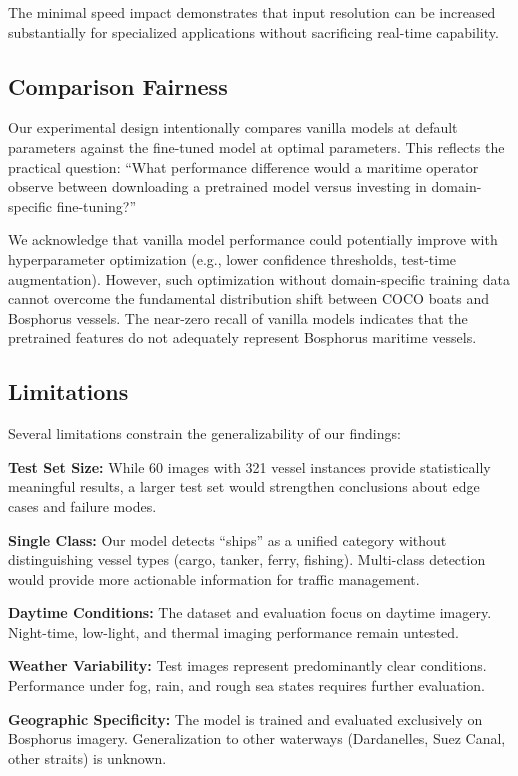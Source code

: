 \documentclass[pdflatex,sn-mathphys-num,Numbered]{sn-jnl}
\begin{document}
The minimal speed impact demonstrates that input resolution can be increased substantially for specialized applications without sacrificing real-time capability.

\subsection{Comparison Fairness}\label{subsec:fairness}

Our experimental design intentionally compares vanilla models at default parameters against the fine-tuned model at optimal parameters. This reflects the practical question: ``What performance difference would a maritime operator observe between downloading a pretrained model versus investing in domain-specific fine-tuning?''

We acknowledge that vanilla model performance could potentially improve with hyperparameter optimization (e.g., lower confidence thresholds, test-time augmentation). However, such optimization without domain-specific training data cannot overcome the fundamental distribution shift between COCO boats and Bosphorus vessels. The near-zero recall of vanilla models indicates that the pretrained features do not adequately represent Bosphorus maritime vessels.

\subsection{Limitations}\label{subsec:limitations}

Several limitations constrain the generalizability of our findings:

\textbf{Test Set Size:} While 60 images with 321 vessel instances provide statistically meaningful results, a larger test set would strengthen conclusions about edge cases and failure modes.

\textbf{Single Class:} Our model detects ``ships'' as a unified category without distinguishing vessel types (cargo, tanker, ferry, fishing). Multi-class detection would provide more actionable information for traffic management.

\textbf{Daytime Conditions:} The dataset and evaluation focus on daytime imagery. Night-time, low-light, and thermal imaging performance remain untested.

\textbf{Weather Variability:} Test images represent predominantly clear conditions. Performance under fog, rain, and rough sea states requires further evaluation.

\textbf{Geographic Specificity:} The model is trained and evaluated exclusively on Bosphorus imagery. Generalization to other waterways (Dardanelles, Suez Canal, other straits) is unknown.
\end{document}
